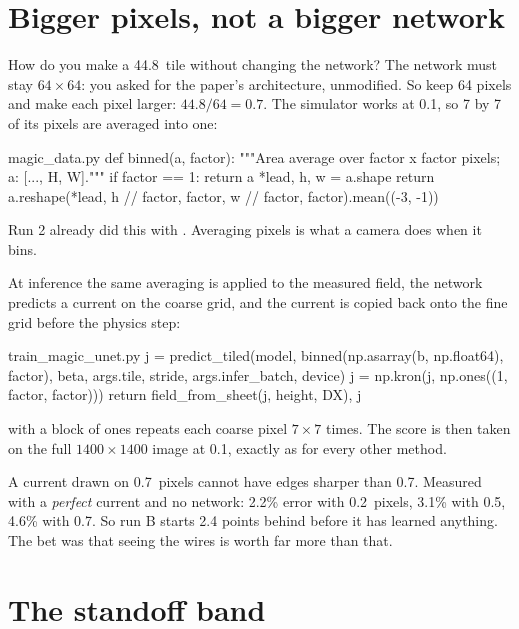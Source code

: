 \section{Bigger pixels, not a bigger network}

How do you make a 44.8\um\ tile without changing the network? The network must stay $64\times64$: you asked for the
paper's architecture, unmodified. So keep 64 pixels and make each pixel larger: $44.8/64=0.7$\um. The simulator works
at 0.1\um, so 7 by 7 of its pixels are averaged into one:

\begin{code*}{magic_data.py}
def binned(a, factor):
    """Area average over factor x factor pixels; a: [..., H, W]."""
    if factor == 1:
        return a
    *lead, h, w = a.shape
    return a.reshape(*lead, h // factor, factor, w // factor, factor).mean((-3, -1))
\end{code*}

Run 2 already did this with . Averaging pixels is what a camera does when it bins.

At inference the same averaging is applied to the measured field, the network predicts a current on the coarse grid,
and the current is copied back onto the fine grid before the physics step:

\begin{code*}{train_magic_unet.py}
    j = predict_tiled(model, binned(np.asarray(b, np.float64), factor), beta, args.tile, stride,
                      args.infer_batch, device)
    j = np.kron(j, np.ones((1, factor, factor)))
    return field_from_sheet(j, height, DX), j
\end{code*}

 with a block of ones repeats each coarse pixel $7\times7$ times. The score is then taken on the full
$1400\times1400$ image at 0.1\um, exactly as for every other method.

\begin{careful}
A current drawn on 0.7\um\ pixels cannot have edges sharper than 0.7\um. Measured with a \emph{perfect} current and no
network: 2.2\% error with 0.2\um\ pixels, 3.1\% with 0.5\um, 4.6\% with 0.7\um. So run B starts 2.4 points behind before
it has learned anything. The bet was that seeing the wires is worth far more than that.
\end{careful}

\section{The standoff band}

